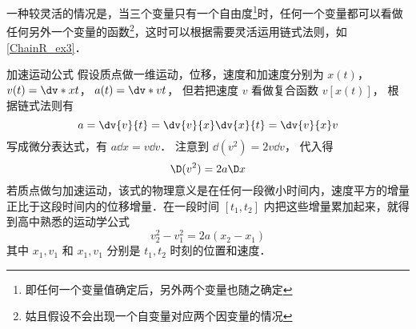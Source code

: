 一种较灵活的情况是，当三个变量只有一个自由度\footnote{即任何一个变量值确定后，另外两个变量也随之确定}时，任何一个变量都可以看做任何另外一个变量的函数\footnote{姑且假设不会出现一个自变量对应两个因变量的情况}，这时可以根据需要灵活运用链式法则，如\autoref{ChainR_ex3}．

\begin{exam}{加速运动公式}\label{ChainR_ex3}
假设质点做一维运动，位移，速度和加速度分别为 $x(t)$，  $v(t) = \dv*{x}{t}$，  $a(t) = \dv*{v}{t}$， 但若把速度 $v$ 看做复合函数 $v[x(t)]$， 根据链式法则有
\begin{equation}
a = \dv{v}{t} = \dv{v}{x}\dv{x}{t} = \dv{v}{x}v
\end{equation}
写成微分表达式，有 $a\dd{x} = v\dd{v}$． 注意到 $\dd (v^2) = 2v\dd{v}$， 代入得
\begin{equation}
\D (v^2) = 2a\D x
\end{equation}
若质点做匀加速运动，该式的物理意义是在任何一段微小时间内，速度平方的增量正比于这段时间内的位移增量．在一段时间 $[t_1,t_2]$ 内把这些增量累加起来，就得到高中熟悉的运动学公式
\begin{equation}
v_2^2-v_1^2 = 2a(x_2-x_1)
\end{equation}
其中 $x_1,v_1$ 和 $x_1,v_1$ 分别是 $t_1,t_2$ 时刻的位置和速度．
\end{exam}

